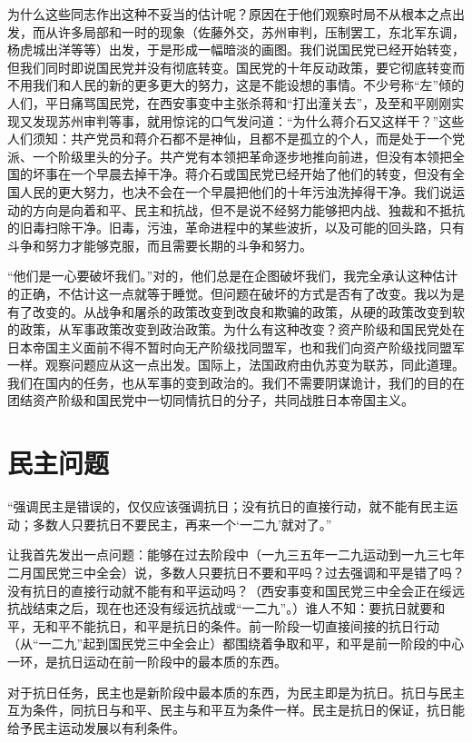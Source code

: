 为什么这些同志作出这种不妥当的估计呢？原因在于他们观察时局不从根本之点出发，而从许多局部和一时的现象（佐藤外交，苏州审判，压制罢工，东北军东调，杨虎城出洋等等）出发，于是形成一幅暗淡的画图。我们说国民党已经开始转变，但我们同时即说国民党并没有彻底转变。国民党的十年反动政策，要它彻底转变而不用我们和人民的新的更多更大的努力，这是不能设想的事情。不少号称“左”倾的人们，平日痛骂国民党，在西安事变中主张杀蒋和“打出潼关去”，及至和平刚刚实现又发现苏州审判等事，就用惊诧的口气发问道：“为什么蒋介石又这样干？”这些人们须知：共产党员和蒋介石都不是神仙，且都不是孤立的个人，而是处于一个党派、一个阶级里头的分子。共产党有本领把革命逐步地推向前进，但没有本领把全国的坏事在一个早晨去掉干净。蒋介石或国民党已经开始了他们的转变，但没有全国人民的更大努力，也决不会在一个早晨把他们的十年污浊洗掉得干净。我们说运动的方向是向着和平、民主和抗战，但不是说不经努力能够把内战、独裁和不抵抗的旧毒扫除干净。旧毒，污浊，革命进程中的某些波折，以及可能的回头路，只有斗争和努力才能够克服，而且需要长期的斗争和努力。

“他们是一心要破坏我们。”对的，他们总是在企图破坏我们，我完全承认这种估计的正确，不估计这一点就等于睡觉。但问题在破坏的方式是否有了改变。我以为是有了改变的。从战争和屠杀的政策改变到改良和欺骗的政策，从硬的政策改变到软的政策，从军事政策改变到政治政策。为什么有这种改变？资产阶级和国民党处在日本帝国主义面前不得不暂时向无产阶级找同盟军，也和我们向资产阶级找同盟军一样。观察问题应从这一点出发。国际上，法国政府由仇苏变为联苏，同此道理。我们在国内的任务，也从军事的变到政治的。我们不需要阴谋诡计，我们的目的在团结资产阶级和国民党中一切同情抗日的分子，共同战胜日本帝国主义。

\section{民主问题}

“强调民主是错误的，仅仅应该强调抗日；没有抗日的直接行动，就不能有民主运动；多数人只要抗日不要民主，再来一个‘一二九’就对了。”

让我首先发出一点问题：能够在过去阶段中（一九三五年一二九运动到一九三七年二月国民党三中全会）说，多数人只要抗日不要和平吗？过去强调和平是错了吗？没有抗日的直接行动就不能有和平运动吗？（西安事变和国民党三中全会正在绥远抗战结束之后，现在也还没有绥远抗战或“一二九”。）谁人不知：要抗日就要和平，无和平不能抗日，和平是抗日的条件。前一阶段一切直接间接的抗日行动（从“一二九”起到国民党三中全会止）都围绕着争取和平，和平是前一阶段的中心一环，是抗日运动在前一阶段中的最本质的东西。

对于抗日任务，民主也是新阶段中最本质的东西，为民主即是为抗日。抗日与民主互为条件，同抗日与和平、民主与和平互为条件一样。民主是抗日的保证，抗日能给予民主运动发展以有利条件。

